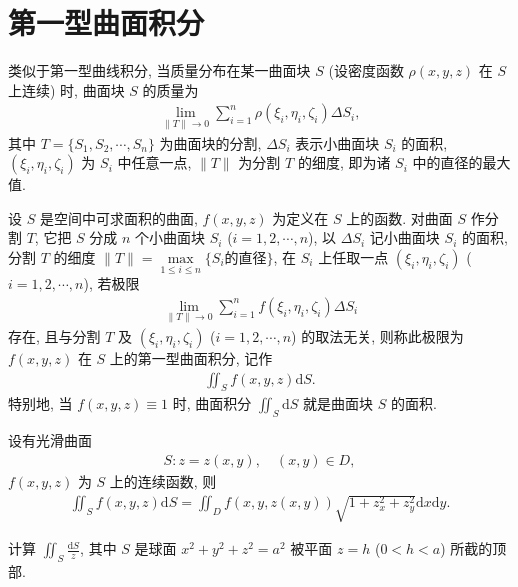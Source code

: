 \documentclass[../../main.tex]{subfiles}%
\begin{document}
\section{第一型曲面积分}

\begin{definition}
类似于第一型曲线积分, 当质量分布在某一曲面块 $S$ (设密度函数 $\rho(x,y,z)$ 在 $S$ 上连续) 时, 曲面块 $S$ 的质量为
\begin{align*}
\lim\limits_{\|T\|\to 0}\sum\limits_{i=1}^n \rho(\xi_i,\eta_i,\zeta_i)\Delta S_i,
\end{align*}
其中 $T=\{S_1,S_2,\cdots,S_n\}$ 为曲面块的分割, $\Delta S_i$ 表示小曲面块 $S_i$ 的面积, $(\xi_i,\eta_i,\zeta_i)$ 为 $S_i$ 中任意一点, $\|T\|$ 为分割 $T$ 的细度, 即为诸 $S_i$ 中的直径的最大值.

设 $S$ 是空间中可求面积的曲面, $f(x,y,z)$ 为定义在 $S$ 上的函数. 对曲面 $S$ 作分割 $T$, 它把 $S$ 分成 $n$ 个小曲面块 $S_i$ ($i=1,2,\cdots,n$), 以 $\Delta S_i$ 记小曲面块 $S_i$ 的面积, 分割 $T$ 的细度 $\|T\|=\max\limits_{1\leqslant i\leqslant n}\{S_i的直径\}$, 在 $S_i$ 上任取一点 $(\xi_i,\eta_i,\zeta_i)$ ($i=1,2,\cdots,n$), 若极限
\begin{align*}
\lim\limits_{\|T\|\to 0}\sum\limits_{i=1}^n f(\xi_i,\eta_i,\zeta_i)\Delta S_i
\end{align*}
存在, 且与分割 $T$ 及 $(\xi_i,\eta_i,\zeta_i)$ ($i=1,2,\cdots,n$) 的取法无关, 则称此极限为 $f(x,y,z)$ 在 $S$ 上的第一型曲面积分, 记作
\begin{align}
\iint_S f(x,y,z)\mathrm{d}S. \label{eq:first_surface_integral}
\end{align}
特别地, 当 $f(x,y,z)\equiv 1$ 时, 曲面积分 $\iint_S \mathrm{d}S$ 就是曲面块 $S$ 的面积.
\end{definition}

\begin{theorem}
设有光滑曲面
\begin{align*}
S: z=z(x,y), \quad (x,y)\in D,
\end{align*}
$f(x,y,z)$ 为 $S$ 上的连续函数, 则
\begin{align}
\iint_S f(x,y,z)\mathrm{d}S = \iint_D f(x,y,z(x,y))\sqrt{1+z_x^2+z_y^2}\mathrm{d}x\mathrm{d}y. \label{eq:surface_integral_calc}
\end{align}
\end{theorem}

\begin{example}
计算 $\iint_S \frac{\mathrm{d}S}{z}$, 其中 $S$ 是球面 $x^2+y^2+z^2=a^2$ 被平面 $z=h$ ($0<h<a$) 所截的顶部.
\end{example}
\end{document}
